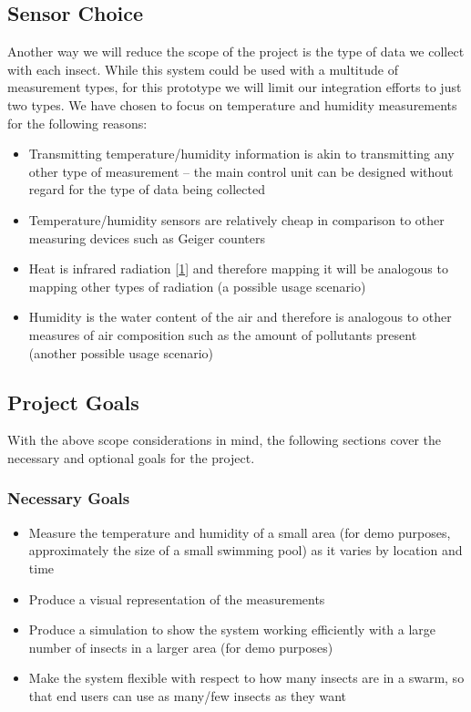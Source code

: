 \documentclass[11pt]{article}
\begin{document}
\subsection{Sensor Choice}
Another way we will reduce the scope of the project is the type of data we collect with each insect. While this system could be used with a multitude of measurement types, for this prototype we will limit our integration efforts to just two types. We have chosen to focus on temperature and humidity measurements for the following reasons:

\begin{itemize}
    \item Transmitting temperature/humidity information is akin to transmitting any other type of measurement -- the main control unit can be designed without regard for the type of data being collected
    \item Temperature/humidity sensors are relatively cheap in comparison to other measuring devices such as Geiger counters
    \item Heat is infrared radiation [\hyperref[sec:references]{1}] and therefore mapping it will be analogous to mapping other types of radiation (a possible usage scenario)
    \item Humidity is the water content of the air and therefore is analogous to other measures of air composition such as the amount of pollutants present (another possible usage scenario)
\end{itemize}

\subsection{Project Goals}
With the above scope considerations in mind, the following sections cover the necessary and optional goals for the project.
\subsubsection{Necessary Goals}
\begin{itemize}
    \item Measure the temperature and humidity of a small area (for demo purposes, approximately the size of a small swimming pool) as it varies by location and time
    \item Produce a visual representation of the measurements
    \item Produce a simulation to show the system working efficiently with a large number of insects in a larger area (for demo purposes) 
    \item Make the system flexible with respect to how many insects are in a swarm, so that end users can use as many/few insects as they want
\end{itemize}
\end{document}
